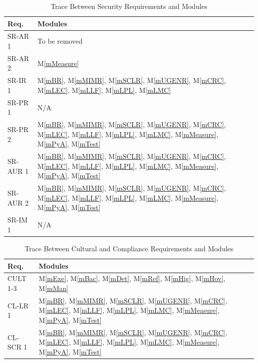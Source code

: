 \documentclass[12pt, titlepage]{article}
\newcommand{\mref}[1]{M\ref{#1}}
\begin{document}
\begin{table}[H]
  \centering
  \begin{tabular}{p{} p{}}
    \toprule \textbf{Req.} & \textbf{Modules}\\
    \midrule
    SR-AR 1 & To be removed\\
    SR-AR 2 & \mref{mMeasure}\\
    SR-IR 1 & \mref{mBR}, \mref{mMIMR}, \mref{mSCLR}, \mref{mUGENR}, \mref{mCRC}, \mref{mLEC}, \mref{mLLF}, \mref{mLPL}, \mref{mLMC}\\
    SR-PR 1 & N/A\\
    SR-PR 2 & \mref{mBR}, \mref{mMIMR}, \mref{mSCLR}, \mref{mUGENR}, \mref{mCRC}, \mref{mLEC}, \mref{mLLF}, \mref{mLPL}, \mref{mLMC}, \mref{mMeasure}, \mref{mPyA}, \mref{mTest}\\
    SR-AUR 1 & \mref{mBR}, \mref{mMIMR}, \mref{mSCLR}, \mref{mUGENR}, \mref{mCRC}, \mref{mLEC}, \mref{mLLF}, \mref{mLPL}, \mref{mLMC}, \mref{mMeasure}, \mref{mPyA}, \mref{mTest}\\
    SR-AUR 2 & \mref{mBR}, \mref{mMIMR}, \mref{mSCLR}, \mref{mUGENR}, \mref{mCRC}, \mref{mLEC}, \mref{mLLF}, \mref{mLPL}, \mref{mLMC}, \mref{mMeasure}, \mref{mPyA}, \mref{mTest}\\
    SR-IM 1 & N/A\\
    \bottomrule
  \end{tabular}
  \caption{Trace Between Security Requirements and Modules}
  \label{tab:SR-mod}
\end{table}

\begin{table}[H]
  \centering
  \begin{tabular}{p{} p{}}
    \toprule \textbf{Req.} & \textbf{Modules}\\
    \midrule
    CULT 1-3 & \mref{mExe}, \mref{mBac}, \mref{mDet}, \mref{mRef}, \mref{mHig}, \mref{mHov}, \mref{mMan}\\
    CL-LR 1 & \mref{mBR}, \mref{mMIMR}, \mref{mSCLR}, \mref{mUGENR}, \mref{mCRC}, \mref{mLEC}, \mref{mLLF}, \mref{mLPL}, \mref{mLMC}, \mref{mMeasure}, \mref{mPyA}, \mref{mTest}\\
    CL-SCR 1 & \mref{mBR}, \mref{mMIMR}, \mref{mSCLR}, \mref{mUGENR}, \mref{mCRC}, \mref{mLEC}, \mref{mLLF}, \mref{mLPL}, \mref{mLMC}, \mref{mMeasure}, \mref{mPyA}, \mref{mTest}\\ 
    \bottomrule
  \end{tabular}
  \caption{Trace Between Cultural and Compliance Requirements and Modules}
  \label{tab:CUL-COMP-mod}
\end{table}
\end{document}
